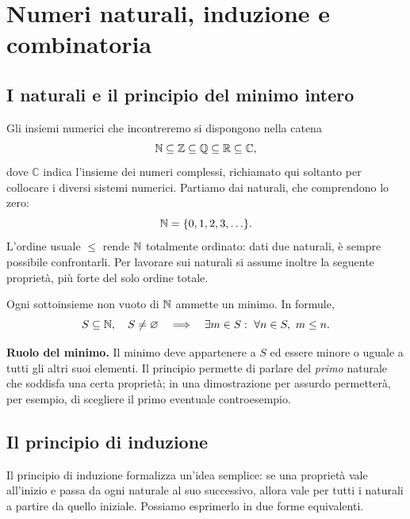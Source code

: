 \chapter{Numeri naturali, induzione e combinatoria}
\label{cap:naturali-combinatoria}

\section{I naturali e il principio del minimo intero}

Gli insiemi numerici che incontreremo si dispongono nella catena
\[
  \mathbb{N}\subseteq\mathbb{Z}\subseteq\mathbb{Q}\subseteq\mathbb{R}\subseteq\mathbb C,
\]
dove $\mathbb C$ indica l'insieme dei numeri complessi, richiamato qui soltanto per collocare i diversi sistemi numerici. Partiamo dai naturali, che comprendono lo zero:
\[
  \mathbb{N}=\{0,1,2,3,\ldots\}.
\]
L'ordine usuale $\le$ rende $\mathbb{N}$ totalmente ordinato: dati due naturali, è sempre possibile confrontarli. Per lavorare sui naturali si assume inoltre la seguente proprietà, più forte del solo ordine totale.

\begin{assioma}
Ogni sottoinsieme non vuoto di $\mathbb{N}$ ammette un minimo. In formule,
\[
  S\subseteq\mathbb{N},\quad S\ne\varnothing
  \quad\Longrightarrow\quad
  \exists m\in S:\ \forall n\in S,\ m\le n.
\]
\end{assioma}

\textbf{Ruolo del minimo.} Il minimo deve appartenere a $S$ ed essere minore o uguale a tutti gli altri suoi elementi. Il principio permette di parlare del \emph{primo} naturale che soddisfa una certa proprietà; in una dimostrazione per assurdo permetterà, per esempio, di scegliere il primo eventuale controesempio.

\section{Il principio di induzione}

Il principio di induzione formalizza un'idea semplice: se una proprietà vale all'inizio e passa da ogni naturale al suo successivo, allora vale per tutti i naturali a partire da quello iniziale. Possiamo esprimerlo in due forme equivalenti.

